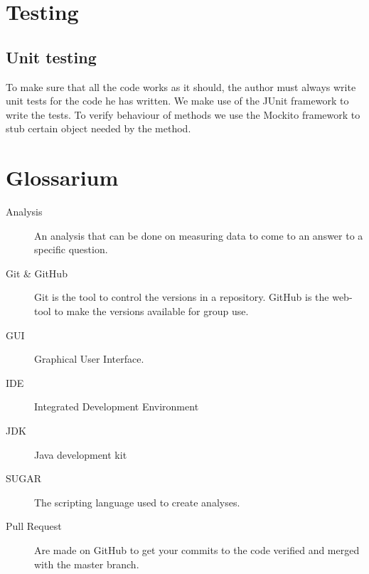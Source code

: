 \documentclass[a4paper]{article}
\begin{document}
\section{Testing}
\subsection{Unit testing}
To make sure that all the code works as it should, the author must always write
unit tests for the code he has written. We make use of the JUnit framework to
write the tests. To verify behaviour of methods we use the Mockito framework to
stub certain object needed by the method.

\section{Glossarium}

\begin{description}

\item[Analysis] An analysis that can be done on measuring data to come to an answer to a specific question.
\item[Git \& GitHub] Git is the tool to control the versions in a repository. GitHub is the web-tool to make the versions available for group use.
\item[GUI] Graphical User Interface.
\item[IDE] Integrated Development Environment
\item[JDK] Java development kit
\item[SUGAR] The scripting language used to create analyses.
\item[Pull Request] Are made on GitHub to get your commits to the code verified and merged with the master branch.

\end{description}
\end{document}
